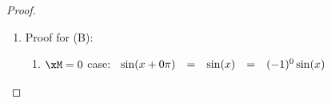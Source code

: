 \begin{proof}
\begin{enumerate}
\begin{enumerate}
      \item Proof for $\xM<0$ cases: Let $\xN\eqd-\xM$ \ldots $\implies \xN>0$.
        \begin{align*}
          \cos\brp{x+\xM\pi}
            &\eqd \cos\brp{x-\xN\pi}
            && \text{by definition of $\xN$}
          \\&= \cos(x)\cos(-\xN\pi)-\sin(x)\sin(-\xN\pi)
            && \text{by \thme{double angle formulas}}&&\text{\xref{thm:trig_double}}
          \\&= \cos(x)\cos(\xN\pi)+\sin(x)\sin(\xN\pi)
            && \text{by \prefp{thm:cos-x}}
          \\&= \cos(x)\cos(0+\xN\pi)+\sin(x)\sin(0+\xN\pi)
          \\&= \cos(x)(-1)^\xN\cos(0)+\sin(x)(-1)^\xN\sin(0)
            && \text{by $\xM\ge0$ results}&&\text{\xref{item:cosxMpiA_gt0}}
          \\&= (-1)^\xN\cos(x)
            && \text{by $\scy\cos(0)=1$, $\scy\sin(0)=0$ results}&&\text{\xref{thm:sin0}}
          \\&\eqd (-1)^{-\xM}\cos(x)
            && \text{by definition of $\xN$}
          \\&= (-1)^{\xM}\cos(x)
        \end{align*}

      \item Proof using complex exponential:
        \begin{align*}
          \cos\brp{ x+\xM\pi} 
            &= \frac{e^{i\brp{ x+\xM\pi}} + e^{ -i\brp{ x+\xM\pi} }}{2}
            && \text{by \thme{Euler formulas}}
            && \text{\xref{cor:trig_ceesee}}
          \\&= e^{i\xM\pi} \brs{\frac{e^{ix} + e^{ -ix}}{2}}
            && \text{by $e^{\alpha\beta}=e^\alpha e^\beta$ result}&&\text{\xref{thm:trig_eab}}
          \\&= \brp{e^{i\pi}}^\xM \cos x 
            && \text{by \thme{Euler formulas}}
            && \text{\xref{cor:trig_ceesee}}
          \\&= (-1)^\xM \cos x 
            && \text{by $e^{i\pi}=-1$ result}&&\text{\xref{prop:expipi}}
        \end{align*}
    \end{enumerate}

  \item Proof for (B):
    \begin{enumerate}
      \item $\xM=0$ case:
        $\begin{array}[t]{rclcl}
          \sin(x+0\pi) &=& \sin(x) &=& (-1)^0\sin(x)
        \end{array}$
        

\end{enumerate}
\end{enumerate}
\end{proof}
